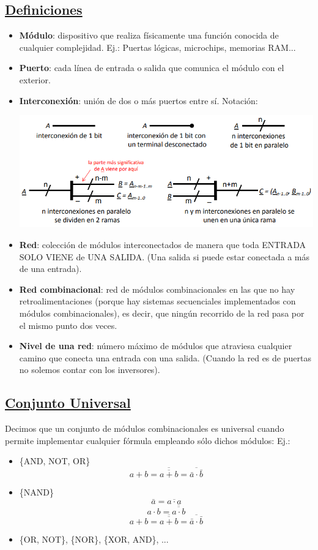 \documentclass[a4paper,10pt]{book}
\begin{document}
\subsection*{\underline {Definiciones}}
\begin{itemize}
\item \textbf{\large{Módulo}}: dispositivo que realiza físicamente una función conocida de cualquier complejidad. Ej.: Puertas lógicas, microchips, memorias RAM...
\item \textbf{\large{Puerto}}: cada línea de entrada o salida que comunica el módulo con el exterior.
\item \textbf{\large{Interconexión}}: unión de dos o más puertos entre sí.
Notación:

\begin{center}
\includegraphics[scale=0.65]{interconexiones}
\end{center}

\item \textbf{\large{Red}}: colección de módulos interconectados de manera que toda ENTRADA SOLO VIENE de UNA SALIDA. (Una salida si puede estar conectada a más de una entrada).
\item \textbf{\large{Red combinacional}}: red de módulos combinacionales en las que no hay retroalimentaciones (porque hay sistemas secuenciales implementados con módulos combinacionales), es decir, que ningún recorrido de la red pasa por el mismo punto dos veces.
\item \textbf{\large{Nivel de una red}}: número máximo de módulos que atraviesa cualquier camino que conecta una entrada con una salida. (Cuando la red es de puertas no solemos contar con los inversores).
\end{itemize}

\subsection*{\underline{Conjunto Universal}}
Decimos que un conjunto de módulos combinacionales es universal cuando permite implementar cualquier fórmula empleando sólo dichos módulos:
Ej.:
\begin{itemize}
\item \{AND, NOT, OR\}
$$a+b=\overline{\overline{a+b}}=\overline{\bar{a}\cdot \bar{b}}$$
\item \{NAND\}
$$\bar{a}=\overline{a\cdot a}$$
$$a\cdot b=\overline{\overline{a\cdot b}}$$
$$a+b=\overline{\overline{a+b}}=\overline{\bar{a}\cdot \bar{b}}$$
\item \{OR, NOT\}, \{NOR\}, \{XOR, AND\}, ...
\end{itemize}
\end{document}
